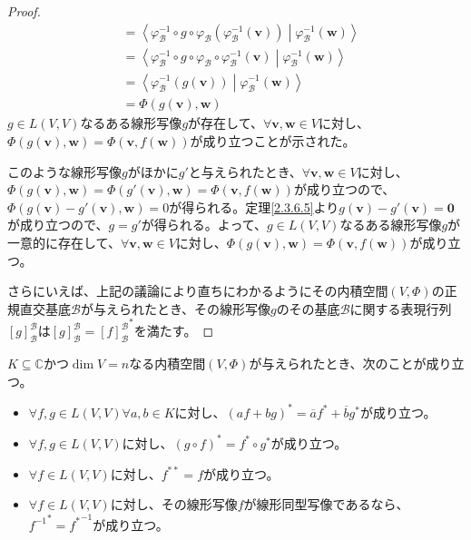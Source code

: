 \documentclass[dvipdfmx]{jsarticle}
\begin{document}
\begin{proof}
\begin{align*}
&= \left\langle \varphi_{\mathcal{B}}^{- 1} \circ g \circ \varphi_{\mathcal{B}}\left( \varphi_{\mathcal{B}}^{- 1}\left( \mathbf{v} \right) \right) \middle| \varphi_{\mathcal{B}}^{- 1}\left( \mathbf{w} \right) \right\rangle\\
&= \left\langle \varphi_{\mathcal{B}}^{- 1} \circ g \circ \varphi_{\mathcal{B}} \circ \varphi_{\mathcal{B}}^{- 1}\left( \mathbf{v} \right) \middle| \varphi_{\mathcal{B}}^{- 1}\left( \mathbf{w} \right) \right\rangle\\
&= \left\langle \varphi_{\mathcal{B}}^{- 1}\left( g\left( \mathbf{v} \right) \right) \middle| \varphi_{\mathcal{B}}^{- 1}\left( \mathbf{w} \right) \right\rangle\\
&= \varPhi\left( g\left( \mathbf{v} \right),\mathbf{w} \right)
\end{align*}
$g \in L(V,V)$なるある線形写像$g$が存在して、$\forall\mathbf{v},\mathbf{w} \in V$に対し、$\varPhi\left( g\left( \mathbf{v} \right),\mathbf{w} \right) = \varPhi\left( \mathbf{v},f\left( \mathbf{w} \right) \right)$が成り立つことが示された。\par
このような線形写像$g$がほかに$g'$と与えられたとき、$\forall\mathbf{v},\mathbf{w} \in V$に対し、$\varPhi\left( g\left( \mathbf{v} \right),\mathbf{w} \right) = \varPhi\left( g'\left( \mathbf{v} \right),\mathbf{w} \right) = \varPhi\left( \mathbf{v},f\left( \mathbf{w} \right) \right)$が成り立つので、$\varPhi\left( g\left( \mathbf{v} \right) - g'\left( \mathbf{v} \right),\mathbf{w} \right) = 0$が得られる。定理\ref{2.3.6.5}より$g\left( \mathbf{v} \right) - g'\left( \mathbf{v} \right) = \mathbf{0}$が成り立つので、$g = g'$が得られる。よって、$g \in L(V,V)$なるある線形写像$g$が一意的に存在して、$\forall\mathbf{v},\mathbf{w} \in V$に対し、$\varPhi\left( g\left( \mathbf{v} \right),\mathbf{w} \right) = \varPhi\left( \mathbf{v},f\left( \mathbf{w} \right) \right)$が成り立つ。\par
さらにいえば、上記の議論により直ちにわかるようにその内積空間$(V,\varPhi)$の正規直交基底$\mathcal{B}$が与えられたとき、その線形写像$g$のその基底$\mathcal{B}$に関する表現行列$[ g]_{\mathcal{B}}^{\mathcal{B}}$は$[ g]_{\mathcal{B}}^{\mathcal{B}} = {[ f]_{\mathcal{B}}^{\mathcal{B}}}^{*}$を満たす。
\end{proof}
\begin{thm}\label{2.3.8.6}
$K \subseteq \mathbb{C}$かつ$\dim V = n$なる内積空間$(V,\varPhi)$が与えられたとき、次のことが成り立つ。
\begin{itemize}
\item
  $\forall f,g \in L(V,V)\forall a,b \in K$に対し、$(af + bg)^{*} = \overline{a}f^{*} + \overline{b}g^{*}$が成り立つ。
\item
  $\forall f,g \in L(V,V)$に対し、$(g \circ f)^{*} = f^{*} \circ g^{*}$が成り立つ。
\item
  $\forall f \in L(V,V)$に対し、$f^{**} = f$が成り立つ。
\item
  $\forall f \in L(V,V)$に対し、その線形写像$f$が線形同型写像であるなら、${f^{- 1}}^{*} = {f^{*}}^{- 1}$が成り立つ。
\end{itemize}
\end{thm}
\end{document}
